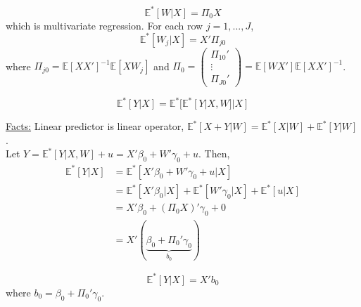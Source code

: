 \documentclass[11pt]{elegantbook}
\begin{document}
\begin{proposition}
    $$\mathbb{E}^*[W|X]=\Pi_0 X$$
    which is multivariate regression. For each row $j=1,...,J$, $$\mathbb{E}^*[W_j|X]=X'\Pi_{j0}$$
    where $\Pi_{j0}=\mathbb{E}[XX']^{-1}\mathbb{E}[XW_j]$ and $\Pi_0=\begin{pmatrix}
        \Pi_{10}'\\
        \vdots\\
        \Pi_{J0}'
    \end{pmatrix}=\mathbb{E}[WX']\mathbb{E}[XX']^{-1}$.
\end{proposition}
\begin{theorem}
    $$\mathbb{E}^*[Y|X]=\mathbb{E}^*[\mathbb{E}^*[Y|X,W]|X]$$
\end{theorem}
\underline{Facts:} Linear predictor is linear operator, $\mathbb{E}^*[X+Y|W]=\mathbb{E}^*[X|W]+\mathbb{E}^*[Y|W]$.\\
Let $Y=\mathbb{E}^*[Y|X,W]+u=X'\beta_0+W'\gamma_0+u$. Then,
\begin{equation}
    \begin{aligned}
        \mathbb{E}^*[Y|X]&=\mathbb{E}^*[X'\beta_0+W'\gamma_0+u|X]\\
        &=\mathbb{E}^*[X'\beta_0|X]+\mathbb{E}^*[W'\gamma_0|X]+\mathbb{E}^*[u|X]\\
        &=X'\beta_0+(\Pi_0X)'\gamma_0+0\\
        &=X'(\underbrace{\beta_0+\Pi_0'\gamma_0}_{b_0})
    \end{aligned}
    \nonumber
\end{equation}
\begin{proposition}
    $$\mathbb{E}^*[Y|X]=X'b_0$$
    where $b_0=\beta_0+\Pi_0'\gamma_0$.
\end{proposition}
\end{document}
